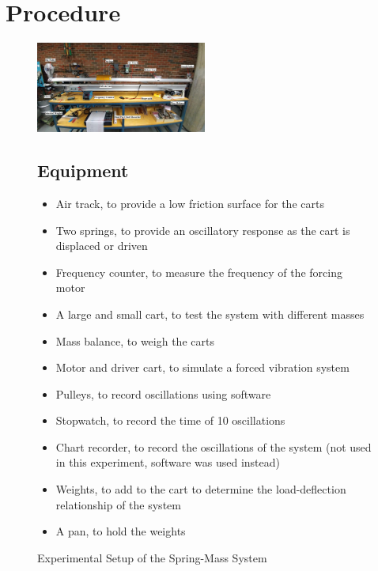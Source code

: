 \section{Procedure}
\begin{figure}[h]
    \centering
    \includegraphics[width=0.5\textwidth]{Sections/Figures/experimental setup.jpg}
    \caption{Experimental Setup of the Spring-Mass System}
\subsection{Equipment}
\begin{itemize}
    \item Air track, to provide a low friction surface for the carts
    \item Two springs, to provide an oscillatory response as the cart is displaced or driven
    \item Frequency counter, to measure the frequency of the forcing motor
    \item A large and small cart, to test the system with different masses
    \item Mass balance, to weigh the carts
    \item Motor and driver cart, to simulate a forced vibration system
    \item Pulleys, to record oscillations using software
    \item Stopwatch, to record the time of 10 oscillations
    \item Chart recorder, to record the oscillations of the system (not used in this experiment, software was used instead)
    \item Weights, to add to the cart to determine the load-deflection relationship of the system
    \item A pan, to hold the weights
\end{itemize}



\end{figure}
